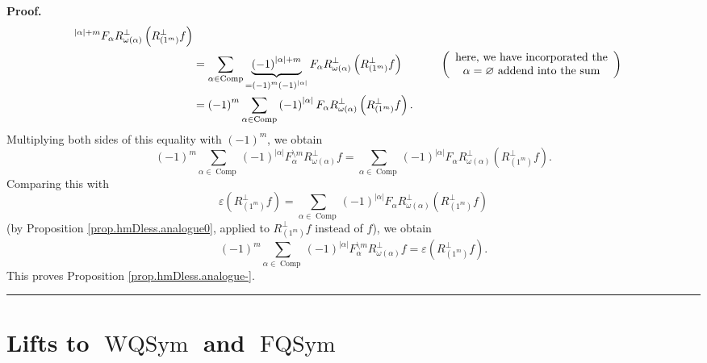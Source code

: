 \documentclass
[numbers=enddot,12pt,final,onecolumn,notitlepage,abstracton]{scrartcl}%
\theoremstyle{definition}
\newenvironment{proof}[1][Proof]{\noindent\textbf{#1.} }{\ \rule{0.5em}{0.5em}}
\newenvironment{verlong}{}{}
\let\sumnonlimits\sum
\renewcommand{\sum}{\sumnonlimits\limits}
\begin{document}
\begin{verlong}
\begin{proof}
\begin{align*}
^{\left\vert \alpha\right\vert +m}F_{\alpha}R_{\omega\left(  \alpha\right)
}^{\perp}\left(  R_{\left(  1^{m}\right)  }^{\perp}f\right) \\
&  =\sum_{\alpha\in\operatorname*{Comp}}\underbrace{\left(  -1\right)
^{\left\vert \alpha\right\vert +m}}_{=\left(  -1\right)  ^{m}\left(
-1\right)  ^{\left\vert \alpha\right\vert }}F_{\alpha}R_{\omega\left(
\alpha\right)  }^{\perp}\left(  R_{\left(  1^{m}\right)  }^{\perp}f\right)
\ \ \ \ \ \ \ \ \ \ \left(
\begin{array}
[c]{c}%
\text{here, we have incorporated the}\\
\alpha=\varnothing\text{ addend into the sum}%
\end{array}
\right) \\
&  =\left(  -1\right)  ^{m}\sum_{\alpha\in\operatorname*{Comp}}\left(
-1\right)  ^{\left\vert \alpha\right\vert }F_{\alpha}R_{\omega\left(
\alpha\right)  }^{\perp}\left(  R_{\left(  1^{m}\right)  }^{\perp}f\right)  .
\end{align*}
Multiplying both sides of this equality with $\left(  -1\right)  ^{m}$, we
obtain%
\[
\left(  -1\right)  ^{m}\sum_{\alpha\in\operatorname*{Comp}}\left(  -1\right)
^{\left\vert \alpha\right\vert }F_{\alpha}^{\setminus m}R_{\omega\left(
\alpha\right)  }^{\perp}f=\sum_{\alpha\in\operatorname*{Comp}}\left(
-1\right)  ^{\left\vert \alpha\right\vert }F_{\alpha}R_{\omega\left(
\alpha\right)  }^{\perp}\left(  R_{\left(  1^{m}\right)  }^{\perp}f\right)  .
\]
Comparing this with%
\[
\varepsilon\left(  R_{\left(  1^{m}\right)  }^{\perp}f\right)  =\sum
_{\alpha\in\operatorname*{Comp}}\left(  -1\right)  ^{\left\vert \alpha
\right\vert }F_{\alpha}R_{\omega\left(  \alpha\right)  }^{\perp}\left(
R_{\left(  1^{m}\right)  }^{\perp}f\right)
\]
(by Proposition \ref{prop.hmDless.analogue0}, applied to $R_{\left(
1^{m}\right)  }^{\perp}f$ instead of $f$), we obtain%
\[
\left(  -1\right)  ^{m}\sum_{\alpha\in\operatorname*{Comp}}\left(  -1\right)
^{\left\vert \alpha\right\vert }F_{\alpha}^{\setminus m}R_{\omega\left(
\alpha\right)  }^{\perp}f=\varepsilon\left(  R_{\left(  1^{m}\right)  }%
^{\perp}f\right)  .
\]
This proves Proposition \ref{prop.hmDless.analogue-}.
\end{proof}
\end{verlong}

\section{\label{sect.WQSym}Lifts to $\operatorname*{WQSym}$ and
$\operatorname*{FQSym}$}
\end{document}
